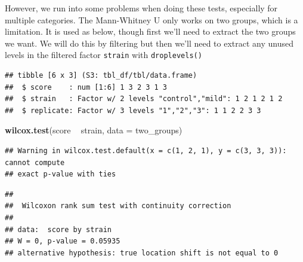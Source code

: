 \documentclass[
]{book}
\newenvironment{Shaded}{\begin{snugshade}}{\end{snugshade}}
\newcommand{\DataTypeTok}[1]{\textcolor[rgb]{0.13,0.29,0.53}{#1}}
\newcommand{\KeywordTok}[1]{\textcolor[rgb]{0.13,0.29,0.53}{\textbf{#1}}}
\newcommand{\NormalTok}[1]{#1}
\newcommand{\OperatorTok}[1]{\textcolor[rgb]{0.81,0.36,0.00}{\textbf{#1}}}
\newcommand{\StringTok}[1]{\textcolor[rgb]{0.31,0.60,0.02}{#1}}
\begin{document}
However, we run into some problems when doing these tests, especially for multiple categories. The Mann-Whitney U only works on two groups, which is a limitation. It is used as below, though first we'll need to extract the two groups we want. We will do this by filtering but then we'll need to extract any unused levels in the filtered factor \texttt{strain} with \texttt{droplevels()}

\begin{Shaded}
\end{Shaded}

\begin{verbatim}
## tibble [6 x 3] (S3: tbl_df/tbl/data.frame)
##  $ score    : num [1:6] 1 3 2 3 1 3
##  $ strain   : Factor w/ 2 levels "control","mild": 1 2 1 2 1 2
##  $ replicate: Factor w/ 3 levels "1","2","3": 1 1 2 2 3 3
\end{verbatim}

\begin{Shaded}
\begin{Highlighting}[]
\KeywordTok{wilcox.test}\NormalTok{(score }\OperatorTok{~}\StringTok{ }\NormalTok{strain, }\DataTypeTok{data =}\NormalTok{ two_groups)}
\end{Highlighting}
\end{Shaded}

\begin{verbatim}
## Warning in wilcox.test.default(x = c(1, 2, 1), y = c(3, 3, 3)): cannot compute
## exact p-value with ties
\end{verbatim}

\begin{verbatim}
## 
## 	Wilcoxon rank sum test with continuity correction
## 
## data:  score by strain
## W = 0, p-value = 0.05935
## alternative hypothesis: true location shift is not equal to 0
\end{verbatim}
\end{document}

